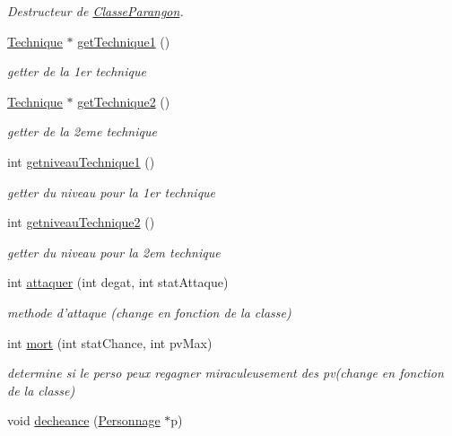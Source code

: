 \begin{DoxyCompactItemize}
\begin{DoxyCompactList}\small\item\em Destructeur de \hyperlink{classClasseParangon}{Classe\-Parangon}. \end{DoxyCompactList}\item 
\hyperlink{classTechnique}{Technique} $\ast$ \hyperlink{classClasseParangon_a8999426adeecdc3dcf6b9e25c51d1f57}{get\-Technique1} ()
\begin{DoxyCompactList}\small\item\em getter de la 1er technique \end{DoxyCompactList}\item 
\hyperlink{classTechnique}{Technique} $\ast$ \hyperlink{classClasseParangon_aeac8f67dd301f1474f0064b270b24bde}{get\-Technique2} ()
\begin{DoxyCompactList}\small\item\em getter de la 2eme technique \end{DoxyCompactList}\item 
int \hyperlink{classClasseParangon_abd79d2b688d94086db792d3977fb7203}{getniveau\-Technique1} ()
\begin{DoxyCompactList}\small\item\em getter du niveau pour la 1er technique \end{DoxyCompactList}\item 
int \hyperlink{classClasseParangon_a1964f83ec53a8304300ee9e657e599bc}{getniveau\-Technique2} ()
\begin{DoxyCompactList}\small\item\em getter du niveau pour la 2em technique \end{DoxyCompactList}\item 
int \hyperlink{classClasseParangon_a8c571e469b800a9f7e9e90194a98b7d7}{attaquer} (int degat, int stat\-Attaque)
\begin{DoxyCompactList}\small\item\em methode d'attaque (change en fonction de la classe) \end{DoxyCompactList}\item 
int \hyperlink{classClasseParangon_ac371eb1d2784d30e27f46b375e0fcf39}{mort} (int stat\-Chance, int pv\-Max)
\begin{DoxyCompactList}\small\item\em determine si le perso peux regagner miraculeusement des pv(change en fonction de la classe) \end{DoxyCompactList}\item 
void \hyperlink{classClasseParangon_ac05f4893aa56ca3e9178f6c2f2f4132b}{decheance} (\hyperlink{classPersonnage}{Personnage} $\ast$p)

\end{DoxyCompactItemize}
